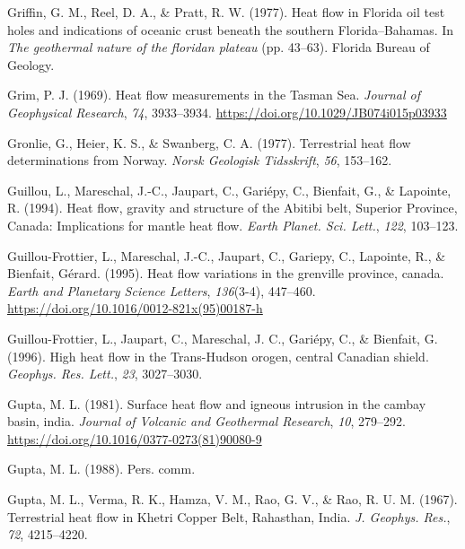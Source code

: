 \begin{CSLReferences}{1}{1}
\leavevmode{}%
Griffin, G. M., Reel, D. A., \& Pratt, R. W. (1977). Heat flow in {Florida} oil test holes and indications of oceanic crust beneath the southern {Florida--Bahamas}. In \emph{The geothermal nature of the floridan plateau} (pp. 43--63). Florida Bureau of Geology.

\leavevmode{}%
Grim, P. J. (1969). Heat flow measurements in the {Tasman Sea}. \emph{Journal of Geophysical Research}, \emph{74}, 3933--3934. \url{https://doi.org/10.1029/JB074i015p03933}

\leavevmode{}%
Gronlie, G., Heier, K. S., \& Swanberg, C. A. (1977). Terrestrial heat flow determinations from {Norway}. \emph{Norsk Geologisk Tidsskrift}, \emph{56}, 153--162.

\leavevmode{}%
Guillou, L., Mareschal, J.-C., Jaupart, C., Gariépy, C., Bienfait, G., \& Lapointe, R. (1994). Heat flow, gravity and structure of the {Abitibi} belt, {Superior Province, Canada}: Implications for mantle heat flow. \emph{Earth Planet. Sci. Lett.}, \emph{122}, 103--123.

\leavevmode{}%
Guillou-Frottier, L., Mareschal, J.-C., Jaupart, C., Gariepy, C., Lapointe, R., \& Bienfait, Gérard. (1995). Heat flow variations in the grenville province, canada. \emph{Earth and Planetary Science Letters}, \emph{136}(3-4), 447--460. \url{https://doi.org/10.1016/0012-821x(95)00187-h}

\leavevmode{}%
Guillou-Frottier, L., Jaupart, C., Mareschal, J. C., Gariépy, C., \& Bienfait, G. (1996). High heat flow in the {Trans-Hudson} orogen, central {Canadian} shield. \emph{Geophys. Res. Lett.}, \emph{23}, 3027--3030.

\leavevmode{}%
Gupta, M. L. (1981). Surface heat flow and igneous intrusion in the cambay basin, india. \emph{Journal of Volcanic and Geothermal Research}, \emph{10}, 279--292. \url{https://doi.org/10.1016/0377-0273(81)90080-9}

\leavevmode{}%
Gupta, M. L. (1988). Pers. comm.

\leavevmode{}%
Gupta, M. L., Verma, R. K., Hamza, V. M., Rao, G. V., \& Rao, R. U. M. (1967). Terrestrial heat flow in {Khetri Copper Belt}, {Rahasthan, India}. \emph{J. Geophys. Res.}, \emph{72}, 4215--4220.


\end{CSLReferences}
